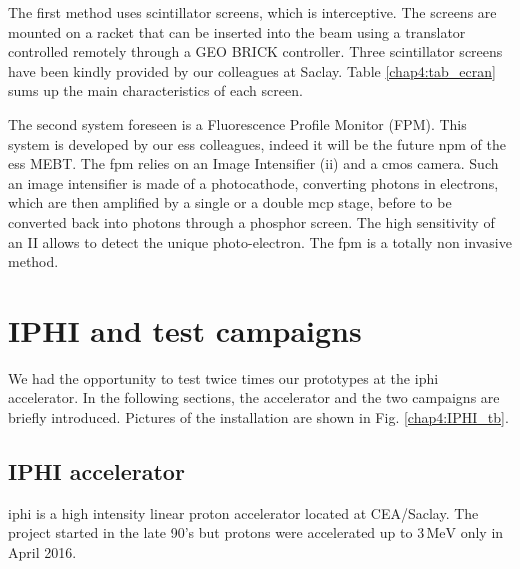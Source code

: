 \begin{refsection}
  The first method uses scintillator screens, which is interceptive. The screens are mounted on a racket that can be inserted into the beam using a translator controlled remotely through a GEO BRICK controller. Three scintillator screens have been kindly provided by our colleagues at Saclay. Table \ref{chap4:tab_ecran} sums up the main characteristics of each screen.

  

  The second system foreseen is a Fluorescence Profile Monitor (FPM). This system is developed by our \acrshort{ess} colleagues, indeed it will be the future \acrshort{npm} of the \acrshort{ess} MEBT. The \acrshort{fpm} relies on an Image Intensifier (\acrshort{ii}) and a \acrshort{cmos} camera.
  Such an image intensifier is made of a photocathode, converting photons in electrons, which are then amplified by a single or a double \acrshort{mcp} stage, before to be converted back into photons through a phosphor screen. The high sensitivity of an II allows to detect the unique photo-electron. The \acrshort{fpm} is a totally non invasive method.



  \section{IPHI and test campaigns}

  We had the opportunity to test twice times our prototypes at the \acrshort{iphi} accelerator. In the following sections, the accelerator and the two campaigns are briefly introduced. Pictures of the installation are shown in Fig. \ref{chap4:IPHI_tb}.

  \subsection{IPHI accelerator}
  \acrshort{iphi} is a high intensity linear proton accelerator located at CEA/Saclay.
  The project started in the late 90's\cite{Beau2000} but protons were accelerated up to $3\,\mathrm{MeV}$ only in April 2016\cite{Gobin2016}.


\end{refsection}
